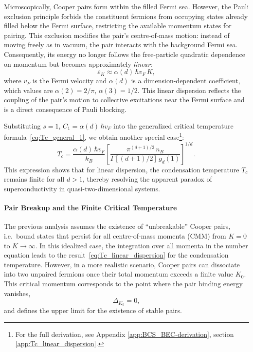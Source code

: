 Microscopically, Cooper pairs form within the filled Fermi sea.  
However, the Pauli exclusion principle forbids the constituent fermions from occupying states already filled below the Fermi surface, restricting the available momentum states for pairing.  
This exclusion modifies the pair’s centre-of-mass motion: instead of moving freely as in vacuum, the pair interacts with the background Fermi sea.  
Consequently, its energy no longer follows the free-particle quadratic dependence on momentum but becomes approximately \textit{linear}:
\begin{equation}
    \varepsilon_K \approx \alpha(d)\, \hbar v_F\, K,
    \label{eq:linear_dispersion}
\end{equation}
where \(v_F\) is the Fermi velocity and \(\alpha(d)\) is a dimension-dependent coefficient, which values are \(\alpha(2) = 2/\pi\), \(\alpha(3) = 1/2\).  
This linear dispersion reflects the coupling of the pair’s motion to collective excitations near the Fermi surface and is a direct consequence of Pauli blocking.

Substituting \(s = 1\), $C_1 = \alpha(d)\, \hbar v_F$ into the generalized critical temperature formula~\eqref{eq:Tc_general_1}, we obtain another special case\footnote{For the full derivation, see Appendix \ref{app:BCS_BEC-derivation}, section \ref{app:Tc_linear_dispersion}.}:
\begin{equation}
\boxed{
    T_c = \frac{\alpha(d)\,\hbar v_F}{k_B}
    \left[
        \frac{\pi^{(d+1)/2}\, n_B}
             {\Gamma\!\left[(d+1)/2\right]\, g_d(1)}
    \right]^{1/d}}\,.
    \label{eq:Tc_linear_dispersion}
\end{equation}
This expression shows that for linear dispersion, the condensation temperature \(T_c\) remains finite for all \(d > 1\), thereby resolving the apparent paradox of superconductivity in quasi-two-dimensional systems.

\paragraph{Pair Breakup and the Finite Critical Temperature}
The previous analysis assumes the existence of ``unbreakable'' Cooper pairs, i.e.\ bound states that persist for all centre-of-mass momenta (CMM) from \(K = 0\) to \(K \to \infty\).  
In this idealized case, the integration over all momenta in the number equation leads to the result~\eqref{eq:Tc_linear_dispersion} for the condensation temperature.  
However, in a more realistic scenario, Cooper pairs can dissociate into two unpaired fermions once their total momentum exceeds a finite value \(K_0\).  
This critical momentum corresponds to the point where the pair binding energy vanishes,
\[
\Delta_{K_0} = 0,
\]
and defines the upper limit for the existence of stable pairs.

